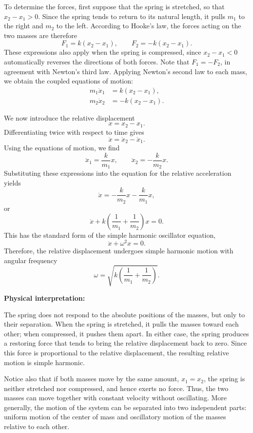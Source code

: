 \documentclass[12pt]{article}
\begin{document}
To determine the forces, first suppose that the spring is stretched, so that $x_2-x_1>0$. Since the spring tends to return to its natural length, it pulls $m_1$ to the right and $m_2$ to the left. According to Hooke's law, the forces acting on the two masses are therefore
\[
    F_1=k(x_2-x_1), \qquad
    F_2=-k(x_2-x_1).
\]
These expressions also apply when the spring is compressed, since $x_2-x_1<0$ automatically reverses the directions of both forces. Note that $F_1=-F_2$, in agreement with Newton's third law. Applying Newton's second law to each mass, we obtain the coupled equations of motion:
\begin{align*}
    m_1\ddot{x}_1 &= k(x_2-x_1),\\
    m_2\ddot{x}_2 &= -k(x_2-x_1).
\end{align*}

We now introduce the relative displacement
\[
    x=x_2-x_1.
\]
Differentiating twice with respect to time gives
\[
    \ddot{x}=\ddot{x}_2-\ddot{x}_1.
\]
Using the equations of motion, we find
\[
    \ddot{x}_1=\frac{k}{m_1}x,
    \qquad
    \ddot{x}_2=-\frac{k}{m_2}x.
\]
Substituting these expressions into the equation for the relative acceleration yields
\[
    \ddot{x}
    =-\frac{k}{m_2}x-\frac{k}{m_1}x,
\]
or
\[
    \boxed{
    \ddot{x}+k\left(\frac{1}{m_1}+\frac{1}{m_2}\right)x=0.
    }
\]
This has the standard form of the simple harmonic oscillator equation,
\[
    \ddot{x}+\omega^2x=0.
\]
Therefore, the relative displacement undergoes simple harmonic motion with angular frequency
\[
    \boxed{
    \omega=\sqrt{k\left(\frac{1}{m_1}+\frac{1}{m_2}\right)}.
    }
\]

\textbf{Physical interpretation:}

The spring does not respond to the absolute positions of the masses, but only to their separation. When the spring is stretched, it pulls the masses toward each other; when compressed, it pushes them apart. In either case, the spring produces a restoring force that tends to bring the relative displacement back to zero. Since this force is proportional to the relative displacement, the resulting relative motion is simple harmonic.

Notice also that if both masses move by the same amount, $x_1=x_2$, the spring is neither stretched nor compressed, and hence exerts no force. Thus, the two masses can move together with constant velocity without oscillating. More generally, the motion of the system can be separated into two independent parts: uniform motion of the center of mass and oscillatory motion of the masses relative to each other.
\end{document}

